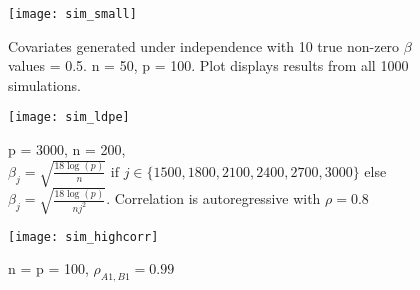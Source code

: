 \begin{figure}[hbtp]
    \begin{center}
    \texttt{[image: sim\_small]}
    \caption{\label{Fig:sim_small} Covariates generated under independence with 10 true non-zero $\beta$ values = 0.5. n = 50, p = 100. Plot displays results from all 1000 simulations.}
    \end{center}
\end{figure}


\begin{figure}[hbtp]
    \begin{center}
    \texttt{[image: sim\_ldpe]}
    \caption{\label{Fig:sim_ldpe} p = 3000, n = 200, $\beta_j = \sqrt{\frac{18\log(p)}{n}} \text{ if } j \in \lbrace 1500, 1800, 2100, 2400, 2700, 3000 \rbrace$ else $\beta_j = \sqrt{\frac{18\log(p)}{nj^2}}$. Correlation is autoregressive with $\rho = 0.8$}
    \end{center}
\end{figure}


\begin{figure}[hbtp]
    \begin{center}
    \texttt{[image: sim\_highcorr]}
    \caption{\label{Fig:sim_highcorr} n = p = 100, $\rho_{A1, B1} = 0.99$}
    \end{center}
\end{figure}